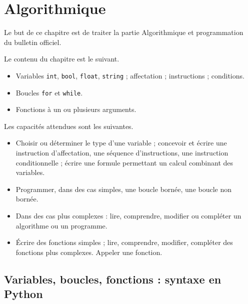 
\chapter{Algorithmique}

Le but de ce chapitre est de traiter la partie \og Algorithmique et programmation \fg~ du bulletin officiel.

Le contenu du chapitre est le suivant.
	\begin{itemize}
		\item Variables \texttt{int}, \texttt{bool}, \texttt{float}, \texttt{string} ; affectation ; instructions ; conditions.
		\item Boucles \texttt{for} et \texttt{while}.
		\item Fonctions à un ou plusieurs arguments.
	\end{itemize}

Les capacités attendues sont les suivantes.
	\begin{itemize}
		\item Choisir ou déterminer le type d'une variable ; concevoir et écrire une instruction d'affectation, une séquence d'instructions, une instruction conditionnelle ; écrire une formule permettant un calcul combinant des variables.
		\item Programmer, dans des cas simples, une boucle bornée, une boucle non bornée.
		\item Dans des cas plus complexes : lire, comprendre, modifier ou compléter un algorithme ou un programme.
		\item Écrire des fonctions simples ; lire, comprendre, modifier, compléter des fonctions plus complexes. Appeler une fonction.
	\end{itemize}


\section{Variables, boucles, fonctions : syntaxe en Python}

